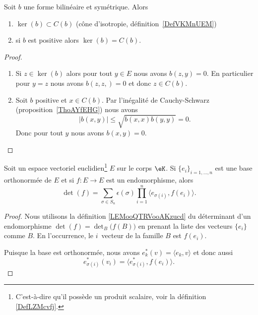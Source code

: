 \begin{proposition}     \label{PropHIWjdMX}
    Soit \( b\) une forme bilinéaire et symétrique. Alors
    \begin{enumerate}
        \item
            \( \ker(b)\subset C(b)\) (cône d'isotropie, définition~\ref{DefVKMnUEM})
        \item
            si \( b\) est positive alors \( \ker(b)=C(b)\).
    \end{enumerate}
\end{proposition}

\begin{proof}
    \begin{enumerate}
        \item
            Si \( z\in\ker(b)\) alors pour tout \( y\in E\) nous avons \( b(z,y)=0\). En particulier pour \( y=z\) nous avons \( b(z,z,)=0\) et donc \( z\in C(b)\).
        \item
            Soit \( b\) positive et \( x\in C(b)\). Par l'inégalité de Cauchy-Schwarz (proposition~\ref{ThoAYfEHG}) nous avons
            \begin{equation}
                | b(x,y) |\leq \sqrt{   b(x,x)b(y,y) }=0.
            \end{equation}
            Donc pour tout \( y\) nous avons \( b(x,y)=0\).
    \end{enumerate}
\end{proof}

\begin{lemma}       \label{LEMooEZFIooXyYybe}
    Soit un espace vectoriel euclidien\footnote{C'est-à-dire qu'il possède un produit scalaire, voir la définition \ref{DefLZMcvfj}.} \( E\) sur le corps \( \eK\). Si \( \{ e_i \}_{i=1,\ldots, n}\) est une base orthonormée de \( E\) et si \( f\colon E\to E\) est un endomorphisme, alors
    \begin{equation}        \label{EQooQAZLooZutFUz}
        \det(f)=\sum_{\sigma\in S_n}\epsilon(\sigma)\prod_{i=1}^n\langle e_{\sigma(i)}, f(e_i)\rangle.
    \end{equation}
\end{lemma}

\begin{proof}
    Nous utilisons la définition \ref{LEMooQTRVooAKzucd} du déterminant d'un endomorphisme \( \det(f)=\det_B\big( f(B) \big)\) en prenant la liste des vecteurs \( \{ e_i \}\) comme \( B\). En l'occurrence, le \( i\)\ieme\ vecteur de la famille \( B\) est \( f(e_i)\).

    Puisque la base est orthonormée, nous avons \( e^*_k(v)=\langle e_k, v\rangle \) et donc aussi
    \begin{equation}
        e^*_{\sigma(i)}(v_i)=\langle e_{\sigma(i)}^*, f(e_i)\rangle.
    \end{equation}
\end{proof}

